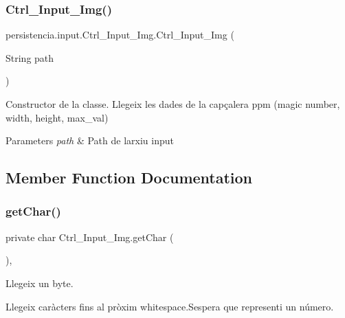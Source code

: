 \subsubsection{\texorpdfstring{Ctrl\+\_\+\+Input\+\_\+\+Img()}{Ctrl\_Input\_Img()}}
{\footnotesize\ttfamily persistencia.\+input.\+Ctrl\+\_\+\+Input\+\_\+\+Img.\+Ctrl\+\_\+\+Input\+\_\+\+Img (\begin{DoxyParamCaption}\item[{String}]{path }\end{DoxyParamCaption})\hspace{0.3cm}{\ttfamily [inline]}}



Constructor de la classe. Llegeix les dades de la capçalera ppm (magic number, width, height, max\+\_\+val) 


\begin{DoxyParams}{Parameters}
{\em path} & Path de l\textquotesingle{}arxiu input \\
\hline
\end{DoxyParams}


\subsection{Member Function Documentation}
\mbox{\label{classpersistencia_1_1input_1_1Ctrl__Input__Img_a3a1584d1b3a8939a809035356598688c}} 
\subsubsection{\texorpdfstring{get\+Char()}{getChar()}}
{\footnotesize\ttfamily private char Ctrl\+\_\+\+Input\+\_\+\+Img.\+get\+Char (\begin{DoxyParamCaption}{ }\end{DoxyParamCaption})\hspace{0.3cm}{\ttfamily [inline]}, {\ttfamily [private]}}



Llegeix un byte. 

Llegeix caràcters fins al pròxim whitespace.\+S\textquotesingle{}espera que representi un número.

